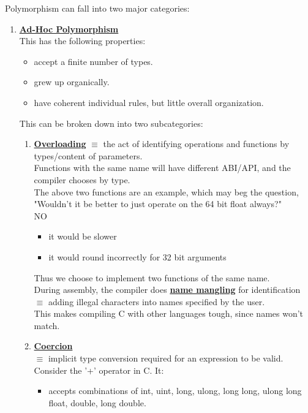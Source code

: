 \documentclass[../../lecture_notes.tex]{subfiles}
\begin{document}
Polymorphism can fall into two major categories:
\begin{enumerate} [itemsep=0mm]
	\item \textbf{\underline{Ad-Hoc Polymorphism}}\\
		This has the following properties:
			\begin{itemize} [itemsep=0mm]
				\item accept a finite number of types.
				\item grew up organically.
				\item have coherent individual rules, but little overall organization.
			\end{itemize}
		This can be broken down into two subcategories:
		\begin{enumerate} [itemsep=0mm]
			\item \textbf{\underline{Overloading}}
				$\equiv$ the act of identifying operations and functions by types/content of parameters.\\
				Functions with the same name will have different ABI/API, and the compiler chooses by type.\\
				The above two functions are an example, which may beg the question,
					"Wouldn't it be better to just operate on the 64 bit float always?"\\
				\indent NO 
					\begin{itemize} [itemsep=0mm]
						\item it would be slower
						\item it would round incorrectly for 32 bit arguments
					\end{itemize}
				Thus we choose to implement two functions of the same name.\\
				During assembly, the compiler does \textbf{\underline{name mangling}} for identification\\
					\indent $\equiv$ adding illegal characters into names specified by the user.\\
					\indent This makes compiling C with other languages tough, since names won't match.
			\item \textbf{\underline{Coercion}}\\
				$\equiv$ implicit type conversion required for an expression to be valid.\\
				Consider the '+' operator in C.  It:
				\begin{itemize} [itemsep=0mm]
					\item accepts combinations of 
						{int, uint, long, ulong, long long, ulong long float, double, long double}.

\end{itemize}
\end{enumerate}
\end{enumerate}
\end{document}
